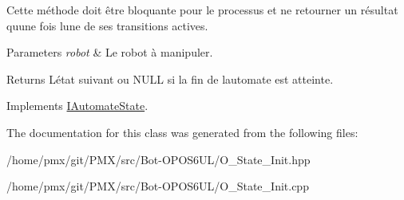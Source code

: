 Cette méthode doit être bloquante pour le processus et ne retourner un résultat qu\textquotesingle{}une fois l\textquotesingle{}une de ses transitions actives.


\begin{DoxyParams}{Parameters}
{\em robot} & Le robot à manipuler. \\
\hline
\end{DoxyParams}
\begin{DoxyReturn}{Returns}
L\textquotesingle{}état suivant ou {\ttfamily N\+U\+LL} si la fin de l\textquotesingle{}automate est atteinte. 
\end{DoxyReturn}


Implements \hyperlink{classIAutomateState_a58bf3c2c5b55f7ba3fc1783fc36e102b}{I\+Automate\+State}.



The documentation for this class was generated from the following files\+:\begin{DoxyCompactItemize}
\item 
/home/pmx/git/\+P\+M\+X/src/\+Bot-\/\+O\+P\+O\+S6\+U\+L/O\+\_\+\+State\+\_\+\+Init.\+hpp\item 
/home/pmx/git/\+P\+M\+X/src/\+Bot-\/\+O\+P\+O\+S6\+U\+L/O\+\_\+\+State\+\_\+\+Init.\+cpp\end{DoxyCompactItemize}
